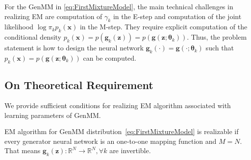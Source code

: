 For the GenMM in \eqref{eq:FirstMixtureModel}, the main technical challenges in realizing EM are computation of $\gamma_k$ in the E-step and computation of the joint likelihood $\log{\pi_k p_k(\bm{x})}$ in the M-step. They require explicit computation of the conditional density $p_k(\bm{x}) =  p(\bm{g}_k(\bm{z})) =p(\bm{g}(\bm{z};\bm{\theta}_k))$. Thus, the problem statement is how to design the neural network $\bm{g}_k(\cdot) = \bm{g}(\cdot;\bm{\theta}_k)$ such that $p_k(\bm{x})=p(\bm{g}(\bm{z};\bm{\theta}_k))$ can be computed.







\subsection{On Theoretical Requirement}

We provide sufficient conditions for realizing EM algorithm associated with learning parameters of GenMM.  

\begin{proposition}
  EM algorithm for GenMM distribution~\eqref{eq:FirstMixtureModel} is realizable if every generator neural network is an one-to-one mapping function and $M=N$. That means $\bm{g}_k(\bm{z}): \mathbb{R}^N \rightarrow \mathbb{R}^N, \forall k$ are invertible.
\end{proposition}

